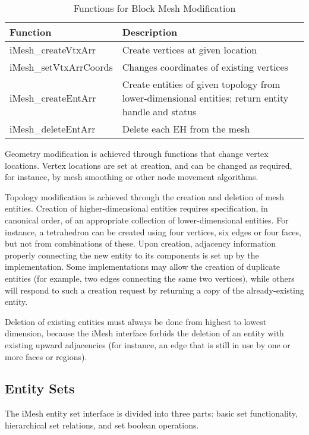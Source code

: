 %
\begin{table}

\caption{Functions for Block Mesh Modification}

\label{table:ModArr} \begin{tabular}{|p{1.25in}|p{223pt}|}
\hline 
{\small Function}&
{\small Description}\tabularnewline
\hline
\hline 
{\small iMesh\_createVtxArr}&
{\small Create vertices at given location}\tabularnewline
\hline 
{\small iMesh\_setVtxArrCoords}&
{\small Changes coordinates of existing vertices}\tabularnewline
\hline 
{\small iMesh\_createEntArr}&
{\small Create entities of given topology from lower-dimensional entities;
return entity handle and status}\tabularnewline
\hline 
{\small iMesh\_deleteEntArr}&
{\small Delete each EH from the mesh}\tabularnewline
\hline
\end{tabular}
\end{table}


Geometry modification is achieved through functions that change vertex
locations. Vertex locations are set at creation, and can be changed
as required, for instance, by mesh smoothing or other node movement
algorithms.

Topology modification is achieved through the creation and deletion
of mesh entities. Creation of higher-dimensional entities requires
specification, in canonical order, of an appropriate collection of
lower-dimensional entities. For instance, a tetrahedron can be created
using four vertices, six edges or four faces, but not from combinations
of these. Upon creation, adjacency information properly connecting
the new entity to its components is set up by the implementation.
Some implementations may allow the creation of duplicate entities
(for example, two edges connecting the same two vertices), while others
will respond to such a creation request by returning a copy of the
already-existing entity.

Deletion of existing entities must always be done from highest to
lowest dimension, because the iMesh interface forbids the deletion
of an entity with existing upward adjacencies (for instance, an edge
that is still in use by one or more faces or regions).


\subsection{Entity Sets\label{sub:Entity-Set-Interface}}

The iMesh entity set interface is divided into three parts: basic
set functionality, hierarchical set relations, and set boolean operations.

